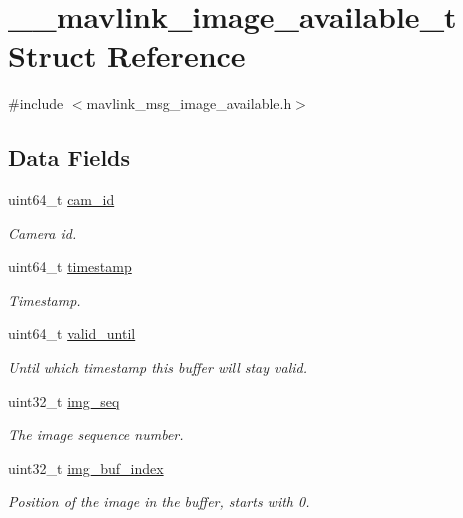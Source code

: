 \hypertarget{struct____mavlink__image__available__t}{\section{\+\_\+\+\_\+mavlink\+\_\+image\+\_\+available\+\_\+t Struct Reference}
\label{struct____mavlink__image__available__t}
}


{\ttfamily \#include $<$mavlink\+\_\+msg\+\_\+image\+\_\+available.\+h$>$}

\subsection*{Data Fields}
\begin{DoxyCompactItemize}
\item 
uint64\+\_\+t \hyperlink{struct____mavlink__image__available__t_adb12c07627b04d6babbbbe9af879adc5}{cam\+\_\+id}
\begin{DoxyCompactList}\small\item\em Camera id. \end{DoxyCompactList}\item 
uint64\+\_\+t \hyperlink{struct____mavlink__image__available__t_aacc732ef97c4f29be485280afe6a5031}{timestamp}
\begin{DoxyCompactList}\small\item\em Timestamp. \end{DoxyCompactList}\item 
uint64\+\_\+t \hyperlink{struct____mavlink__image__available__t_af17ddf110570d8aa5530b54e9dae1b15}{valid\+\_\+until}
\begin{DoxyCompactList}\small\item\em Until which timestamp this buffer will stay valid. \end{DoxyCompactList}\item 
uint32\+\_\+t \hyperlink{struct____mavlink__image__available__t_a8574894f5f5fd321cea7c83ef6756873}{img\+\_\+seq}
\begin{DoxyCompactList}\small\item\em The image sequence number. \end{DoxyCompactList}\item 
uint32\+\_\+t \hyperlink{struct____mavlink__image__available__t_af983c6207a4062b08e9f99e889fde124}{img\+\_\+buf\+\_\+index}
\begin{DoxyCompactList}\small\item\em Position of the image in the buffer, starts with 0. \end{DoxyCompactList}\item 

\end{DoxyCompactItemize}
